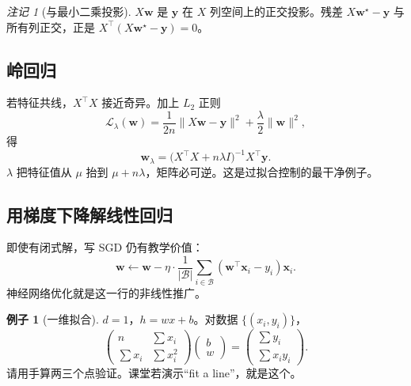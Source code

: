 \documentclass[11pt,a4paper]{article}
\theoremstyle{definition}
\newtheorem{example}{例子}[section]
\theoremstyle{plain}
\theoremstyle{remark}
\newtheorem{remark}{注记}[section]
\newcommand{\loss}{\mathcal{L}}
\begin{document}
\begin{remark}[与最小二乘投影]
$X\mathbf{w}$ 是 $\mathbf{y}$ 在 $X$ 列空间上的正交投影。残差 $X\mathbf{w}^\star-\mathbf{y}$ 与所有列正交，正是 $X^\top(X\mathbf{w}^\star-\mathbf{y})=0$。
\end{remark}

\subsection{岭回归}

若特征共线，$X^\top X$ 接近奇异。加上 $L_2$ 正则
\begin{equation}
  \loss_\lambda(\mathbf{w})=\frac{1}{2n}\|X\mathbf{w}-\mathbf{y}\|^2+\frac{\lambda}{2}\|\mathbf{w}\|^2,
\end{equation}
得
\begin{equation}
  \mathbf{w}_\lambda=\bigl(X^\top X+n\lambda I\bigr)^{-1}X^\top\mathbf{y}.
\end{equation}
$\lambda$ 把特征值从 $\mu$ 抬到 $\mu+n\lambda$，矩阵必可逆。这是过拟合控制的最干净例子。

\subsection{用梯度下降解线性回归}

即使有闭式解，写 SGD 仍有教学价值：
\begin{equation}
  \mathbf{w}\leftarrow\mathbf{w}-\eta\cdot\frac{1}{|\mathcal{B}|}\sum_{i\in\mathcal{B}}(\mathbf{w}^\top\mathbf{x}_i-y_i)\mathbf{x}_i.
\end{equation}
神经网络优化就是这一行的非线性推广。

\begin{example}[一维拟合]
$d=1$，$h=w x+b$。对数据 $\{(x_i,y_i)\}$，
\begin{equation}
  \begin{pmatrix} n & \sum x_i\\ \sum x_i & \sum x_i^2\end{pmatrix}
  \begin{pmatrix}b\\ w\end{pmatrix}
  =\begin{pmatrix}\sum y_i\\ \sum x_i y_i\end{pmatrix}.
\end{equation}
请用手算两三个点验证。课堂若演示``fit a line''，就是这个。
\end{example}
\end{document}
